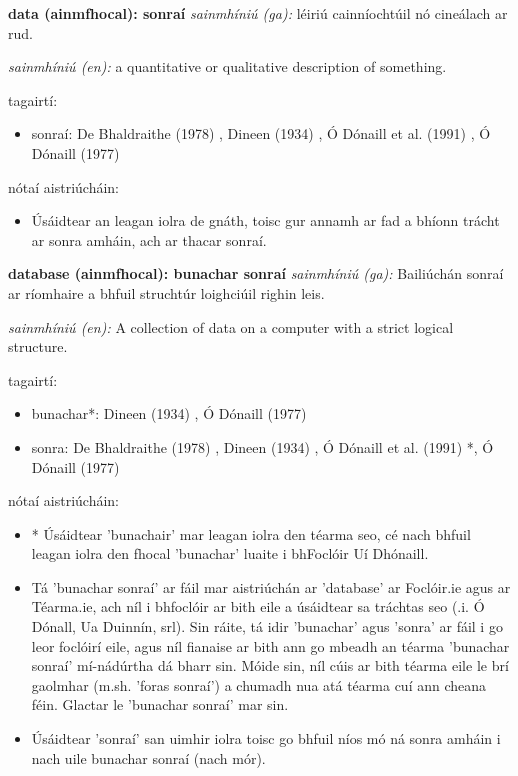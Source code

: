 \documentclass{article}
\begin{document}
\textbf{data (ainmfhocal): sonraí}
\textit{sainmhíniú (ga):} léiriú cainníochtúil nó cineálach ar rud.

\textit{sainmhíniú (en):} a quantitative or qualitative description of something.

tagairtí:
\begin{itemize}
	\item sonraí: De Bhaldraithe (1978) \cite{de-bhaldraithe}, Dineen (1934) \cite{dineen}, Ó Dónaill et al. (1991) \cite{focloir-beag}, Ó Dónaill (1977) \cite{odonaill}
\end{itemize}

nótaí aistriúcháin:
\begin{itemize}
	\item Úsáidtear an leagan iolra de gnáth, toisc gur annamh ar fad a bhíonn trácht ar sonra amháin, ach ar thacar sonraí.
\end{itemize}


\textbf{database (ainmfhocal): bunachar sonraí}
\textit{sainmhíniú (ga):} Bailiúchán sonraí ar ríomhaire a bhfuil struchtúr loighciúil righin leis.

\textit{sainmhíniú (en):} A collection of data on a computer with a strict logical structure.

tagairtí:
\begin{itemize}
	\item bunachar*: Dineen (1934) \cite{dineen}, Ó Dónaill (1977) \cite{odonaill}
	\item sonra: De Bhaldraithe (1978) \cite{de-bhaldraithe}, Dineen (1934) \cite{dineen}, Ó Dónaill et al. (1991) \cite{focloir-beag}*, Ó Dónaill (1977) \cite{odonaill}
\end{itemize}

nótaí aistriúcháin:
\begin{itemize}
	\item * Úsáidtear 'bunachair' mar leagan iolra den téarma seo, cé nach bhfuil leagan iolra den fhocal 'bunachar' luaite i bhFoclóir Uí Dhónaill.
	\item Tá 'bunachar sonraí' ar fáil mar aistriúchán ar 'database' ar Foclóir.ie agus ar Téarma.ie, ach níl i bhfoclóir ar bith eile a úsáidtear sa tráchtas seo (.i. Ó Dónall, Ua Duinnín, srl). Sin ráite, tá idir 'bunachar' agus 'sonra' ar fáil i go leor foclóirí eile, agus níl fianaise ar bith ann go mbeadh an téarma 'bunachar sonraí' mí-nádúrtha dá bharr sin. Móide sin, níl cúis ar bith téarma eile le brí gaolmhar (m.sh. 'foras sonraí') a chumadh nua atá téarma cuí ann cheana féin. Glactar le 'bunachar sonraí' mar sin.
	\item Úsáidtear 'sonraí' san uimhir iolra toisc go bhfuil níos mó ná sonra amháin i nach uile bunachar sonraí (nach mór).
\end{itemize}
\end{document}

